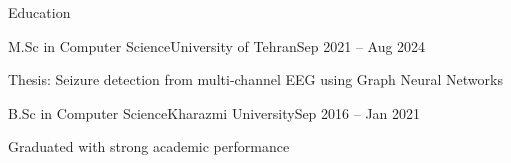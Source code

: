\documentclass[]{main}
\begin{document}
\begin{section}{Education}
 \begin{subsectionnobullet}{M.Sc in Computer Science}{University of Tehran}{Sep 2021 -- Aug 2024}{}
     \item Thesis: Seizure detection from multi-channel EEG using Graph Neural Networks
 \end{subsectionnobullet}
 \begin{subsectionnobullet}{B.Sc in Computer Science}{Kharazmi University}{Sep 2016 -- Jan 2021}{}
     \item Graduated with strong academic performance
 \end{subsectionnobullet}
\end{section}

\end{document}
